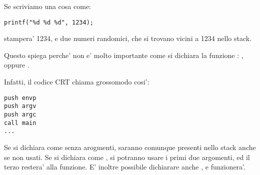 Se scriviamo una cosa come:

\begin{lstlisting}
printf("%d %d %d", 1234);
\end{lstlisting}

\printf stampera' 1234, e due numeri randomici, che si trovano vicini a 1234 nello stack.

\par
Questo spiega perche' non e' molto importante come si dichiara la funzione \main : \main,  oppure .

Infatti, il codice \ac{CRT} chiama \main grossomodo cosi':

\begin{lstlisting}
push envp
push argv
push argc
call main
...
\end{lstlisting}

Se si dichiara \main come \main senza arogmenti, saranno comunque presenti nello stack anche se non usati.
Se si dichiara \main come ,
si potranno usare i primi due argomenti, ed il terzo restera'  alla funzione.
E' inoltre possibile dichiarare anche , e funzionera'.
